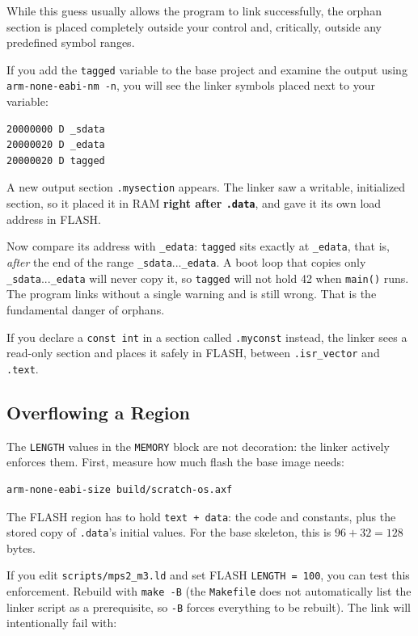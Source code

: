 While this guess usually allows the program to link successfully, the orphan section is placed completely outside your control and, critically, outside any predefined symbol ranges.

If you add the \texttt{tagged} variable to the base project and examine the output using \texttt{arm-none-eabi-nm -n}, you will see the linker symbols placed next to your variable:

\begin{lstlisting}[language=bash]
20000000 D _sdata
20000020 D _edata
20000020 D tagged
\end{lstlisting}

A new output section \texttt{.mysection} appears. The linker saw a writable, initialized section, so it placed it in RAM \textbf{right after \texttt{.data}}, and gave it its own load address in FLASH. 

Now compare its address with \texttt{\_edata}: \texttt{tagged} sits exactly at \texttt{\_edata}, that is, \textit{after} the end of the range \texttt{\_sdata}...\texttt{\_edata}. A boot loop that copies only \texttt{\_sdata}...\texttt{\_edata} will never copy it, so \texttt{tagged} will not hold 42 when \texttt{main()} runs. The program links without a single warning and is still wrong. That is the fundamental danger of orphans.

If you declare a \texttt{const int} in a section called \texttt{.myconst} instead, the linker sees a read-only section and places it safely in FLASH, between \texttt{.isr\_vector} and \texttt{.text}. 

\subsection{Overflowing a Region}
The \texttt{LENGTH} values in the \texttt{MEMORY} block are not decoration: the linker actively enforces them. First, measure how much flash the base image needs:

\begin{lstlisting}[language=bash]
arm-none-eabi-size build/scratch-os.axf
\end{lstlisting}

The FLASH region has to hold \texttt{text + data}: the code and constants, plus the stored copy of \texttt{.data}'s initial values. For the base skeleton, this is $96 + 32 = 128$ bytes. 

If you edit \texttt{scripts/mps2\_m3.ld} and set FLASH \texttt{LENGTH = 100}, you can test this enforcement. Rebuild with \texttt{make -B} (the \texttt{Makefile} does not automatically list the linker script as a prerequisite, so \texttt{-B} forces everything to be rebuilt). The link will intentionally fail with:

